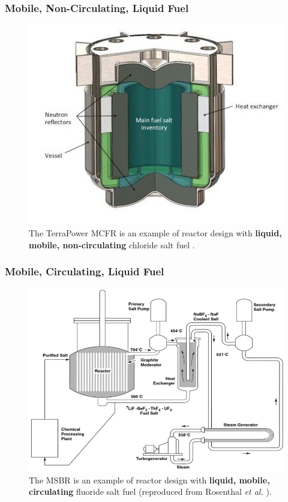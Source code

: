 \begin{frame}
\frametitle{Mobile, Non-Circulating, Liquid Fuel}
\begin{figure}[t]
\vspace*{-0.1in}
\hspace*{-0.35in}
\includegraphics[height=0.6\textwidth]{./images/mcfr-crossection.jpg}
\caption{The TerraPower MCFR is an example of reactor design with 
\textbf{liquid, mobile, non-circulating} chloride salt fuel 
\cite{doene_southern_2018}.}
\end{figure}   

\end{frame}


\begin{frame} %
\frametitle{Mobile, Circulating, Liquid Fuel}
\vspace{-2mm}
\begin{figure}[t]
      \includegraphics[height=0.6\textwidth]{./images/msbr_scheme.png}
	\caption{The \gls{MSBR} is an example of reactor design with 
	\textbf{liquid, mobile, circulating} fluoride salt fuel 
	(reproduced from Rosenthal \emph{et al.} 
	\cite{rosenthal_molten-salt_1970}).}
\end{figure}   

\end{frame}


